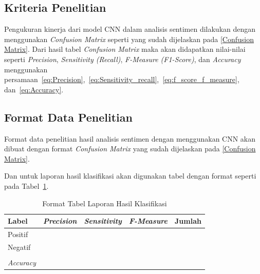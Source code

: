 \subsection{Kriteria Penelitian}
Pengukuran kinerja dari model CNN dalam analisis sentimen dilakukan dengan menggunakan
\emph{Confusion Matrix} seperti yang sudah dijelaskan pada \autoref{Confusion Matrix}. Dari hasil tabel
\emph{Confusion Matrix} maka akan didapatkan nilai-nilai seperti \emph{Precision},
\emph{Sensitivity (Recall)}, \emph{F-Measure (F1-Score)}, dan \emph{Accuracy} menggunakan
persamaan~\ref{eq:Precision},~\ref{eq:Sensitivity_recall},~\ref{eq:f_score_f_measure}, dan~\ref{eq:Accuracy}.

\subsection{Format Data Penelitian}\label{subsection:menentukan_format_data_penelitian}
Format data penelitian hasil analisis sentimen dengan menggunakan CNN akan dibuat dengan format
\emph{Confusion Matrix} yang sudah dijelaskan pada \autoref{Confusion Matrix}.

Dan untuk laporan hasil klasifikasi akan digunakan tabel dengan format seperti pada
Tabel~\ref{tab:format_laporan_hasil_klasifikasi}.

\begin{table}[H]
  \centering
  \caption{Format Tabel Laporan Hasil Klasifikasi}
  \label{tab:format_laporan_hasil_klasifikasi}
  \begin{tabular}{|lllll|}
    \hline
    \multicolumn{1}{|l|}{Label}             & \multicolumn{1}{l|}{\textit{Precision}} & \multicolumn{1}{l|}{\textit{Sensitivity}} & \multicolumn{1}{l|}{\textit{F-Measure}} & Jumlah \\ \hline
    \multicolumn{1}{|l|}{Positif}           & \multicolumn{1}{l|}{}                   & \multicolumn{1}{l|}{}                     & \multicolumn{1}{l|}{}                   &        \\ \hline
    \multicolumn{1}{|l|}{Negatif}           & \multicolumn{1}{l|}{}                   & \multicolumn{1}{l|}{}                     & \multicolumn{1}{l|}{}                   &        \\ \hline
    \multicolumn{5}{|l|}{}                                                                                                                                                           \\ \hline
    \multicolumn{1}{|l|}{\textit{Accuracy}} & \multicolumn{3}{l|}{}                   &                                                                                              \\ \hline
  \end{tabular}
\end{table}

